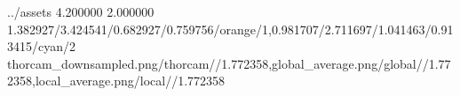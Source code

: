 \def\TrioSecondZoomList{thorcam1}
\TrioComparisonFigure
    {../assets}
    {4.200000}
    {2.000000}
    {1.382927/3.424541/0.682927/0.759756/orange/1,0.981707/2.711697/1.041463/0.913415/cyan/2}
    {thorcam_downsampled.png/thorcam//1.772358,global_average.png/global//1.772358,local_average.png/local//1.772358}
